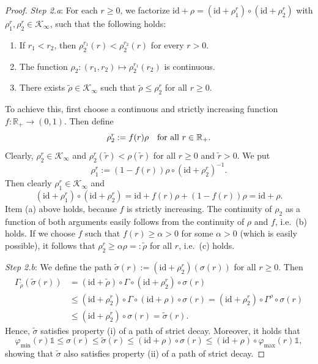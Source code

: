 \documentclass[10pt, oneside, a4paper]{article}
\newcommand{\R}{\mathbb{R}}
\newcommand{\unit}{\mathds{1}}
\newcommand{\id}{\mathrm{id}}
\newcommand{\KC}{\mathcal{K}}
\begin{document}
\begin{proof}
\emph{Step 2.a}: For each $r \geq 0$, we factorize $\id + \rho = (\id + \rho_1^r) \circ (\id + \rho_2^r)$ with $\rho_1^r,\rho_2^r \in \KC_{\infty}$, such that the following holds:%
\begin{enumerate}
\item[(a)] If $r_1 < r_2$, then $\rho_2^{r_1}(r) < \rho_2^{r_2}(r)$ for every $r > 0$.%
\item[(b)] The function $\rho_2:(r_1,r_2) \mapsto \rho_2^{r_1}(r_2)$ is continuous.%
\item[(c)] There exists $\tilde{\rho} \in \KC_{\infty}$ such that $\tilde{\rho} \leq \rho_2^r$ for all $r \geq 0$.%
\end{enumerate}
To achieve this, first choose a continuous and strictly increasing function $f:\R_+ \rightarrow (0,1)$. Then define%
\begin{equation*}
  \rho_2^r:= f(r)\rho \mbox{\quad for all\ } r \in \R_+.%
\end{equation*}
Clearly, $\rho_2^r \in \KC_{\infty}$ and $\rho_2^r(\tilde{r}) < \rho(\tilde{r})$ for all $r \geq 0$ and $\tilde{r} > 0$. We put%
\begin{equation*}
  \rho_1^r := (1 - f(r))\rho \circ (\id + \rho_2^r)^{-1}.%
\end{equation*}
Then clearly $\rho_1^r \in \KC_{\infty}$ and%
\begin{equation*}
  (\id + \rho_1^r) \circ (\id + \rho_2^r) = \id + f(r)\rho + (1 - f(r)) \rho = \id + \rho.%
\end{equation*}
Item (a) above holds, because $f$ is strictly increasing. The continuity of $\rho_2$ as a function of both arguments easily follows from the continuity of $\rho$ and $f$, i.e.~(b) holds. If we choose $f$ such that $f(r) \geq \alpha > 0$ for some $\alpha > 0$ (which is easily possible), it follows that $\rho_2^r \geq \alpha\rho =: \tilde{\rho}$ for all $r$, i.e.~(c) holds.%

\emph{Step 2.b}: We define the path $\tilde{\sigma}(r) := (\id + \rho_2^r)(\sigma(r))$ for all $r \geq 0$. Then%
\begin{align*}
  \Gamma_{\tilde{\rho}}(\tilde{\sigma}(r)) &= (\id + \tilde{\rho}) \circ \Gamma \circ (\id + \rho_2^r) \circ \sigma(r) \\
	                                         &\leq (\id + \rho_2^r) \circ \Gamma \circ (\id + \rho) \circ \sigma(r) = (\id + \rho_2^r) \circ \Gamma^{\rho} \circ \sigma(r) \\
																					 &\leq (\id + \rho_2^r) \circ \sigma(r) = \tilde{\sigma}(r).%
\end{align*}
Hence, $\tilde{\sigma}$ satisfies property (i) of a path of strict decay. Moreover, it holds that%
\begin{equation*}
  \varphi_{\min}(r)\unit \leq \sigma(r) \leq \tilde{\sigma}(r) \leq (\id + \rho) \circ \sigma(r) \leq (\id + \rho) \circ \varphi_{\max}(r)\unit,%
\end{equation*}
showing that $\tilde{\sigma}$ also satisfies property (ii) of a path of strict decay.%


\end{proof}
\end{document}
